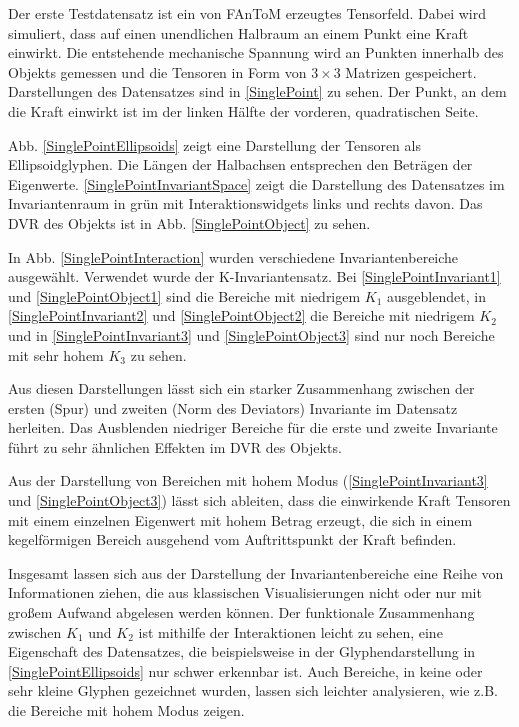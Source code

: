\documentclass[a4paper,fontsize=12pt,toc=bib,halfparskip]{scrartcl}
\begin{document}
Der erste Testdatensatz ist ein von FAnToM erzeugtes Tensorfeld. Dabei wird simuliert, dass auf einen unendlichen Halbraum an einem Punkt eine Kraft einwirkt. Die entstehende mechanische Spannung wird an Punkten innerhalb des Objekts gemessen und die Tensoren in Form von $3\times3$ Matrizen gespeichert. Darstellungen des Datensatzes sind in \ref{SinglePoint} zu sehen. Der Punkt, an dem die Kraft einwirkt ist im der linken H\"alfte der vorderen, quadratischen Seite. 

Abb. \ref{SinglePointEllipsoids} zeigt eine Darstellung der Tensoren als Ellipsoidglyphen. Die L\"angen der Halbachsen entsprechen den Betr\"agen der  Eigenwerte. \ref{SinglePointInvariantSpace} zeigt die Darstellung des Datensatzes im Invariantenraum in gr\"un mit Interaktionswidgets links und rechts davon. Das DVR des Objekts ist in Abb. \ref{SinglePointObject} zu sehen.

In Abb. \ref{SinglePointInteraction} wurden verschiedene Invariantenbereiche ausgew\"ahlt. Verwendet wurde der K-Invariantensatz. Bei \ref{SinglePointInvariant1} und \ref{SinglePointObject1} sind die Bereiche mit niedrigem $K_1$ ausgeblendet, in \ref{SinglePointInvariant2} und \ref{SinglePointObject2} die Bereiche mit niedrigem $K_2$ und in \ref{SinglePointInvariant3} und \ref{SinglePointObject3} sind nur noch Bereiche mit sehr hohem $K_3$ zu sehen. 

Aus diesen Darstellungen l\"asst sich ein starker Zusammenhang zwischen der ersten (Spur) und zweiten (Norm des Deviators) Invariante im Datensatz herleiten. Das Ausblenden niedriger Bereiche f\"ur die erste und zweite Invariante f\"uhrt zu sehr \"ahnlichen Effekten im DVR des Objekts.  

Aus der Darstellung von Bereichen mit hohem Modus (\ref{SinglePointInvariant3} und \ref{SinglePointObject3}) l\"asst sich ableiten, dass die einwirkende Kraft Tensoren mit einem einzelnen Eigenwert mit hohem Betrag erzeugt, die sich in einem kegelf\"ormigen Bereich ausgehend vom Auftrittspunkt der Kraft befinden.

Insgesamt lassen sich aus der Darstellung der Invariantenbereiche eine Reihe von Informationen ziehen, die aus klassischen Visualisierungen nicht oder nur mit gro{\ss}em Aufwand abgelesen werden k\"onnen. Der funktionale Zusammenhang zwischen $K_1$ und $K_2$ ist mithilfe der Interaktionen leicht zu sehen, eine Eigenschaft des Datensatzes, die beispielsweise in der Glyphendarstellung in \ref{SinglePointEllipsoids} nur schwer erkennbar ist. Auch Bereiche, in keine oder sehr kleine Glyphen gezeichnet wurden, lassen sich leichter analysieren, wie z.B. die Bereiche mit hohem Modus zeigen. 
\end{document}
